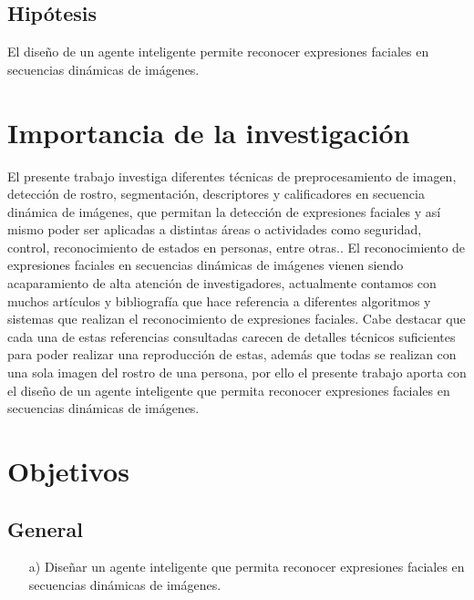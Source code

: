 \subsection{Hipótesis}

El diseño de un agente inteligente permite reconocer expresiones faciales en secuencias dinámicas de imágenes.

\section{Importancia de la investigación} 

El presente trabajo investiga diferentes técnicas de preprocesamiento de imagen, detección de rostro, segmentación, descriptores y calificadores en secuencia dinámica de imágenes, que permitan la detección de expresiones faciales y así mismo poder ser aplicadas a distintas áreas o actividades como seguridad, control, reconocimiento de estados en personas, entre otras..
\vskip 0.3cm
El reconocimiento de expresiones faciales en secuencias dinámicas de imágenes vienen siendo acaparamiento de alta atención de investigadores, actualmente contamos con muchos artículos y bibliografía que hace referencia a diferentes algoritmos y sistemas que realizan el reconocimiento de expresiones faciales. Cabe destacar que cada una de estas referencias consultadas carecen de detalles técnicos suficientes para poder realizar una reproducción de estas, además que todas se realizan con una sola imagen del rostro de una persona, por ello el presente trabajo aporta con el diseño de un agente inteligente que permita reconocer expresiones faciales en secuencias dinámicas de imágenes.

\section{Objetivos}

\subsection{General}
\begin{enumerate} 
\item[a)] Diseñar un agente inteligente que permita reconocer expresiones faciales en secuencias dinámicas de imágenes.
\end{enumerate}

